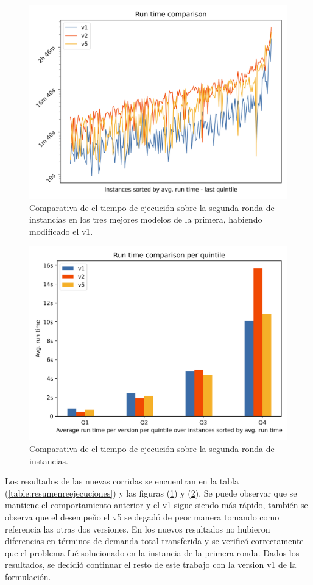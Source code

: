 \documentclass{article}
\begin{document}
  \begin{figure}[h!]
    \centering
    \includegraphics[width=12cm]{../resources/run_time_comparsion_rerun.png}
    \caption{Comparativa de el tiempo de ejecución sobre la segunda ronda de instancias en los tres mejores modelos de la primera, habiendo modificado el v1.} \label{fig:runtimecomparisonrerun}
  \end{figure}

  \begin{figure}[h!]
    \centering
    \includegraphics[width=12cm]{../resources/run_time_comparsion_by_quintile_rerun.png}
    \caption{Comparativa de el tiempo de ejecución sobre la segunda ronda de instancias.} \label{fig:firstfourquintilesrerun}
  \end{figure}

  Los resultados de las nuevas corridas se encuentran en la tabla (\ref{table:resumenreejecuciones}) y las figuras (\ref{fig:runtimecomparisonrerun}) y (\ref{fig:firstfourquintilesrerun}). Se puede observar que se mantiene el comportamiento anterior y el v1 sigue siendo más rápido, también se observa que el desempeño el v5 se degadó de peor manera tomando como referencia las otras dos versiones. En los nuevos resultados no hubieron diferencias en términos de demanda total transferida y se verificó correctamente que el problema fué solucionado en la instancia de la primera ronda. Dados los resultados, se decidió continuar el resto de este trabajo con la version v1 de la formulación.
\end{document}
